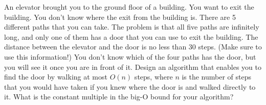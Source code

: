 \documentclass{article}
\begin{document}
\vskip 0.25in 


\begin{problem}  %
An elevator brought you to the ground floor of a building. You want to exit the building. You don't know where the exit from the building is. There are 5 different paths that you can take. The problem is that all five paths are infinitely long, and only one of them has a door that you can use to exit the building. The distance between the elevator and the door is no less than 30 steps. (Make sure to use this information!) You don't know which of the four paths has the door, but you will see it once you are in front of it. Design an algorithm that enables you to find the door by walking at most $O(n)$ steps, where $n$ is the number of steps that you would have taken if you knew where the door is and walked directly to it. What is the constant multiple in the big-O bound for your algorithm? 
\end{problem}
\end{document}
